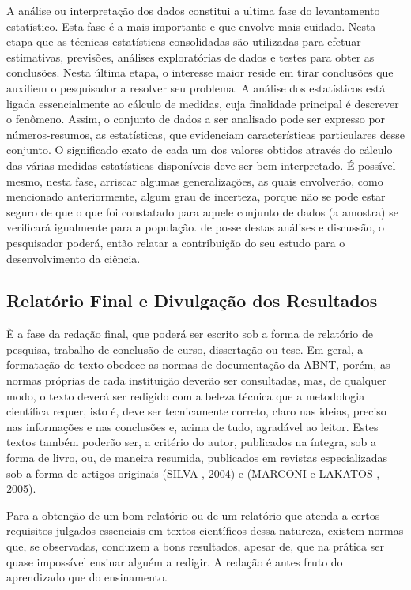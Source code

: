\inic A análise ou interpretação dos dados constitui a ultima fase do levantamento estatístico. Esta fase é a mais importante e que
envolve mais cuidado. Nesta etapa que as técnicas estatísticas
consolidadas são utilizadas para efetuar estimativas, previsões,
análises exploratórias de dados e testes para obter as conclusões.
Nesta última etapa, o interesse maior reside em tirar conclusões
que auxiliem o pesquisador a resolver seu problema. A análise dos
estatísticos está ligada essencialmente ao cálculo de medidas,
cuja finalidade principal é descrever o fenômeno. Assim, o
conjunto de dados a ser analisado pode ser expresso por
números-resumos, as estatísticas, que evidenciam características
particulares desse conjunto. O significado exato de cada um dos
valores obtidos através do cálculo das várias medidas estatísticas
disponíveis deve ser bem interpretado. É possível mesmo, nesta
fase, arriscar algumas generalizações, as quais envolverão, como
mencionado anteriormente, algum grau de incerteza, porque não se
pode estar seguro de que o que foi constatado para aquele conjunto
de dados (a amostra) se verificará igualmente para a população. de posse destas análises e discussão, o pesquisador poderá, então relatar a contribuição do seu estudo para o desenvolvimento da ciência.



\subsection{Relatório Final e Divulgação dos Resultados}

\inic È a fase da redação final, que poderá ser escrito sob a
forma de relatório de pesquisa, trabalho de conclusão de curso,
dissertação ou tese. Em geral, a formatação de texto obedece as
normas de documentação da ABNT, porém, as normas próprias de cada
instituição deverão ser consultadas, mas, de qualquer modo, o
texto deverá ser redigido com a beleza técnica que a metodologia
científica requer, isto é, deve ser tecnicamente correto, claro
nas ideias, preciso nas informações e nas conclusões e, acima de
tudo, agradável ao leitor. Estes textos também poderão ser, a
critério do autor, publicados na íntegra, sob a forma de livro,
ou, de maneira resumida, publicados em revistas especializadas sob
a forma de artigos originais (SILVA , 2004) e (MARCONI e LAKATOS , 2005).\vskip0.3cm

\inic Para a obtenção de um bom relatório ou de um relatório que atenda a certos requisitos julgados essenciais em textos científicos dessa natureza, existem normas que, se observadas, conduzem a bons resultados, apesar de, que na prática ser quase impossível ensinar alguém a redigir. A redação é antes fruto do aprendizado que do ensinamento.      





